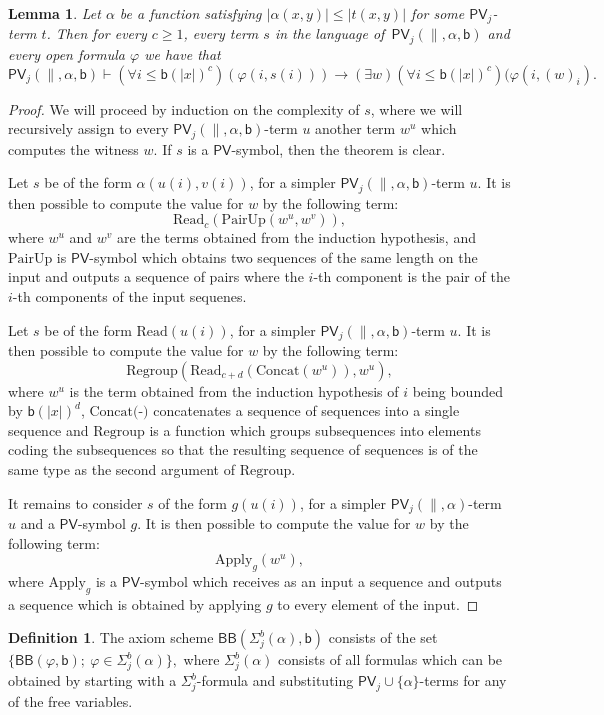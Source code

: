 \documentclass[11pt]{article}
\newcommand{\PV}{\mathsf{PV}}
\newcommand{\bd}{\mathsf{b}}
\newcommand{\Read}{\text{Read}}
\newcommand{\abs}[1]{\lvert #1 \rvert}
\newtheorem{lemma}[theorem]{Lemma}
\theoremstyle{definition}
\theoremstyle{definition}
\newtheorem{definition}[theorem]{Definition}
\theoremstyle{remark}
\begin{document}
\begin{lemma}\label{lemmaopenbb}
    Let $\alpha$ be a function satisfying $\abs{\alpha(x,y)}\leq \abs{t(x,y)}$ for some $\PV_j$-term $t$. Then for every $c\geq 1$, every term $s$ in the language of~$\PV_j(\parallel, \alpha,\bd)$ and every open formula $\varphi$ we have that \[\PV_j(\parallel,\alpha,\bd)\vdash (\forall i\leq \bd(\abs{x})^c)(\varphi(i,s(i)))\to (\exists w)(\forall i\leq \bd(\abs{x})^c)(\varphi(i,(w)_i).\]
\end{lemma}
\begin{proof}
    We will proceed by induction on the complexity of $s$, where we will recursively assign to every $\PV_j(\parallel,\alpha,\bd)$-term $u$ another term $w^u$ which computes the witness $w$. If $s$ is a $\PV$-symbol, then the theorem is clear.

    Let $s$ be of the form $\alpha(u(i),v(i))$, for a simpler $\PV_j(\parallel,\alpha,\bd)$-term $u$. It is then possible to compute the value for $w$ by the following term:
    \[\Read_c(\text{PairUp}(w^u,w^v)),\]
    where $w^u$ and $w^v$ are the terms obtained from the induction hypothesis, and $\text{PairUp}$ is $\PV$-symbol which obtains two sequences of the same length on the input and outputs a sequence of pairs where the $i$-th component is the pair of the $i$-th components of the input sequenes.

    Let $s$ be of the form $\Read(u(i))$, for a simpler $\PV_j(\parallel,\alpha,\bd)$-term $u$. It is then possible to compute the value for $w$ by the following term:
    \[\text{Regroup}(\Read_{c+d}(\text{Concat}(w^u)),w^u),\]
    where $w^u$ is the term obtained from the induction hypothesis of $i$ being bounded by $\bd(\abs{x})^d$, $\text{Concat(-)}$ concatenates a sequence of sequences into a single sequence and $\text{Regroup}$ is a function which groups subsequences into elements coding the subsequences so that the resulting sequence of sequences is of the same type as the second argument of $\text{Regroup}$.

    It remains to consider $s$ of the form  $g(u(i))$, for a simpler $\PV_j(\parallel,\alpha)$-term $u$ and a $\PV$-symbol $g$. It is then possible to compute the value for $w$ by the following term:
    \[\text{Apply}_g(w^u),\]
    where $\text{Apply}_g$ is a $\PV$-symbol which receives as an input a sequence and outputs a sequence which is obtained by applying $g$ to every element of the input.
\end{proof}

\begin{definition}
    The axiom scheme $\mathsf{BB}(\Sigma^b_{j}(\alpha),\bd)$ consists of the set $\{\mathsf{BB}(\varphi,\bd);\:\varphi\in\Sigma^b_j(\alpha)\},$
    where $\Sigma^b_j(\alpha)$ consists of all formulas which can be obtained by starting with a $\Sigma^b_j$-formula and substituting $\PV_j\cup\{\alpha\}$-terms for any of the free variables.
\end{definition}
\end{document}
